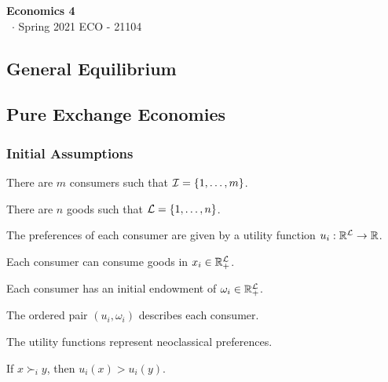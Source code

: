 \documentclass[8pt,a4paper]{extarticle}
\renewcommand{\csClass}{Economics 4}
\renewcommand{\csClassCode}{ECO - 21104}
\renewcommand{\csTerm}{Spring 2021}
\begin{document}
\begin{titlepage}
    \begin{center}
	\vspace*{1cm}
	\Huge
        \textbf{\csClass}
	\vspace{0.5cm} \\
	\Large
        \cs\ $\cdot$ \csTerm
        \vfill
        \csAuthorName
	\vspace{0.8cm}
        \csClassCode\\
        \csSchool     
    \end{center}
\end{titlepage}

\begin{multicols}{3}
\setcounter{page}{1}

\section{General Equilibrium}

\subsection{Pure Exchange Economies}

\subsubsection*{Initial Assumptions}

\begin{bulletlist}
\item There are $m$ consumers such that $\mathcal{I} = \{1, \ldots, m\}$.
\item There are $n$ goods such that $\mathcal{L} = \{1, \ldots, n\}$.
\item The preferences of each consumer are given by a utility function $u_i : \mathbb{R}^{\mathcal{L}} \to \mathbb{R}$.
\item Each consumer can consume goods in $x_i \in \mathbb{R}_+^{\mathcal{L}}$.
\item Each consumer has an initial endowment of $\omega_i \in \mathbb{R}_+^{\mathcal{L}}$.
\item The ordered pair $(u_i, \omega_i)$ describes each consumer.
\item The utility functions represent neoclassical preferences.
\end{bulletlist}

\begin{boxprop}
	If $x \succ_i y$, then $u_i(x) > u_i(y)$.
\end{boxprop}


\end{multicols}
\end{document}
